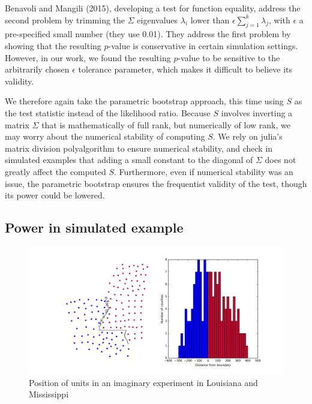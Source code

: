 \documentclass[letter]{article}
\makeatletter
\def\maxwidth{\ifdim\Gin@nat@width>\linewidth\linewidth
\else\Gin@nat@width\fi}
\let\Oldincludegraphics\includegraphics
\renewcommand{\includegraphics}[1]{\Oldincludegraphics[width=.8\maxwidth]{#1}}
\makeatother
\begin{document}
Benavoli and Mangili (2015), developing a test for function equality,
address the second problem by trimming the \(\Sigma\) eigenvalues
\(\lambda_i\) lower than \(\epsilon \sum_{j=1}^k \lambda_j\), with
\(\epsilon\) a pre-specified small number (they use 0.01). They address
the first problem by showing that the resulting \(p\)-value is
conservative in certain simulation settings. However, in our work, we
found the resulting \(p\)-value to be sensitive to the arbitrarily
chosen \(\epsilon\) tolerance parameter, which makes it difficult to
believe its validity.

We therefore again take the parametric bootstrap approach, this time
using \(S\) as the test statistic instead of the likelihood ratio.
Because \(S\) involves inverting a matrix \(\Sigma\) that is
mathematically of full rank, but numerically of low rank, we may worry
about the numerical stability of computing \(S\). We rely on julia's
matrix division polyalgorithm to ensure numerical stability, and check
in simulated examples that adding a small constant to the diagonal of
\(\Sigma\) does not greatly affect the computed \(S\). Furthermore, even
if numerical stability was an issue, the parametric bootstrap ensures
the frequentist validity of the test, though its power could be lowered.
    


    	\subsection{Power in simulated
example}\label{power-in-simulated-example}

\begin{figure}
\centering
\includegraphics{figures/mississippi_counties.png}
\caption{\label{fig:mississippi_counties} Position of units in an
imaginary experiment in Louisiana and Mississippi}
\end{figure}
\end{document}
